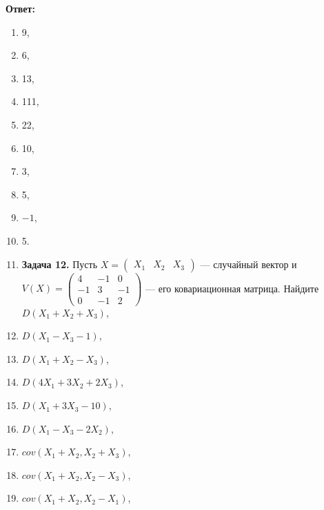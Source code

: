 \textbf{Ответ:}

\begin{enumerate}
\item  9,

\item  6,

\item  13,

\item  111,

\item  22,

\item  10,

\item  3,

\item  5,

\item  $-1$,

\item  5.

\item \textbf{Задача 12. }Пусть $X=(\begin{array}{ccc} {X_{1} } & {X_{2} } & {X_{3} } \end{array})$ --- случайный вектор и $V\left(X\right)=\left(\begin{array}{ccc} {4} & {-1} & {0} \\ {-1} & {3} & {-1} \\ {0} & {-1} & {2} \end{array}\right)$ --- его ковариационная матрица. Найдите $D(X_{1} +X_{2} +X_{3} )$,

\item  $D(X_{1} -X_{3} -1)$,

\item  $D(X_{1} +X_{2} -X_{3} )$,

\item  $D(4X_{1} +3X_{2} +2X_{3} )$,

\item  $D(X_{1} +3X_{3} -10)$,

\item  $D(X_{1} -X_{3} -2X_{2} )$,

\item  $cov(X_{1} +X_{2} ,X_{2} +X_{3} )$,

\item  $cov(X_{1} +X_{2} ,X_{2} -X_{3} )$,

\item  $cov(X_{1} +X_{2} ,X_{2} -X_{1} )$,


\end{enumerate}
